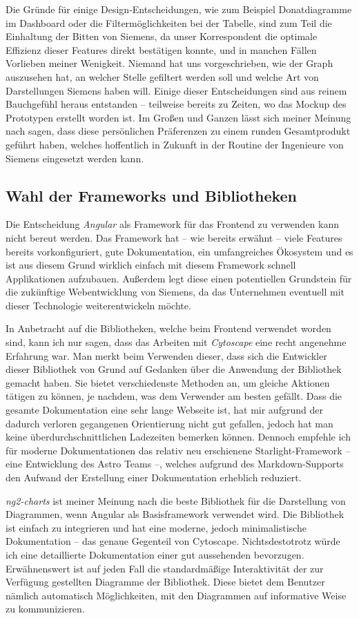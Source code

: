 Die Gründe für einige Design-Entscheidungen, wie zum Beispiel Donatdiagramme im Dashboard oder die Filtermöglichkeiten bei der Tabelle, sind zum Teil die Einhaltung der Bitten von Siemens, da unser Korrespondent die optimale Effizienz dieser Features direkt bestätigen konnte, und in manchen Fällen Vorlieben meiner Wenigkeit. Niemand hat uns vorgeschrieben, wie der Graph auszusehen hat, an welcher Stelle gefiltert werden soll und welche Art von Darstellungen Siemens haben will. Einige dieser Entscheidungen sind aus reinem Bauchgefühl heraus entstanden -- teilweise bereits zu Zeiten, wo das Mockup des Prototypen erstellt worden ist. Im Großen und Ganzen lässt sich meiner Meinung nach sagen, dass diese persönlichen Präferenzen zu einem runden Gesamtprodukt geführt haben, welches hoffentlich in Zukunft in der Routine der Ingenieure von Siemens eingesetzt werden kann.

\subsection{Wahl der Frameworks und Bibliotheken}

Die Entscheidung \emph{Angular} als Framework für das Frontend zu verwenden kann nicht bereut werden. Das Framework hat -- wie bereits erwähnt -- viele Features bereits vorkonfiguriert, gute Dokumentation, ein umfangreiches Ökosystem und es ist aus diesem Grund wirklich einfach mit diesem Framework schnell Applikationen aufzubauen. Außerdem legt diese einen potentiellen Grundstein für die zukünftige Webentwicklung von Siemens, da das Unternehmen eventuell mit dieser Technologie weiterentwickeln möchte.

In Anbetracht auf die Bibliotheken, welche beim Frontend verwendet worden sind, kann ich nur sagen, dass das Arbeiten mit \emph{Cytoscape} eine recht angenehme Erfahrung war. Man merkt beim Verwenden dieser, dass sich die Entwickler dieser Bibliothek von Grund auf Gedanken über die Anwendung der Bibliothek gemacht haben. Sie bietet verschiedenste Methoden an, um gleiche Aktionen tätigen zu können, je nachdem, was dem Verwender am besten gefällt. Dass die gesamte Dokumentation eine sehr lange Webseite ist, hat mir aufgrund der dadurch verloren gegangenen Orientierung nicht gut gefallen, jedoch hat man keine überdurchschnittlichen Ladezeiten bemerken können. Dennoch empfehle ich für moderne Dokumentationen das relativ neu erschienene Starlight-Framework -- eine Entwicklung des Astro Teams --, welches aufgrund des Markdown-Supports den Aufwand der Erstellung einer Dokumentation erheblich reduziert.

\emph{ng2-charts} ist meiner Meinung nach die beste Bibliothek für die Darstellung von Diagrammen, wenn Angular als Basisframework verwendet wird. Die Bibliothek ist einfach zu integrieren und hat eine moderne, jedoch minimalistische Dokumentation -- das genaue Gegenteil von Cytoscape. Nichtsdestotrotz würde ich eine detaillierte Dokumentation einer gut aussehenden bevorzugen. Erwähnenswert ist auf jeden Fall die standardmäßige Interaktivität der zur Verfügung gestellten Diagramme der Bibliothek. Diese bietet dem Benutzer nämlich automatisch Möglichkeiten, mit den Diagrammen auf informative Weise zu kommunizieren.